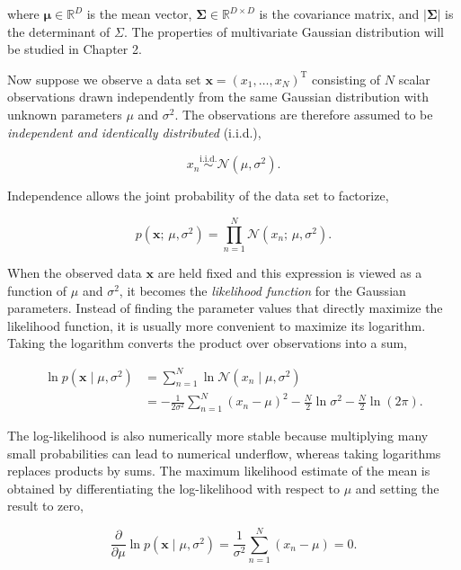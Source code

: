 \documentclass[10pt,twocolumn]{memoir}
\begin{document}
where $\boldsymbol{\mu}\in\mathbb{R}^{D}$ is the mean vector, $\boldsymbol{\Sigma}\in\mathbb{R}^{D\times D}$ is the covariance matrix, and $|\boldsymbol{\Sigma}|$ is the determinant of $\Sigma$. The properties of multivariate Gaussian distribution will be studied in Chapter 2.

Now suppose we observe a data set $\mathbf{x}=(x_1,\ldots,x_N)^{\mathrm{T}}$ consisting of $N$ scalar observations drawn independently from the same Gaussian distribution with unknown parameters $\mu$ and $\sigma^2$. The observations are therefore assumed to be \textit{independent and identically distributed} (i.i.d.),

\begin{equation}
    x_n \overset{\mathrm{i.i.d.}}{\sim}\mathcal{N}(\mu,\sigma^2).
\end{equation}

Independence allows the joint probability of the data set to factorize,

\begin{equation}
    p(\mathbf{x};\,\mu,\sigma^2) = \prod_{n=1}^{N}\mathcal{N}(x_n;\,\mu,\sigma^2).
\end{equation}

When the observed data $\mathbf{x}$ are held fixed and this expression is viewed as a function of $\mu$ and $\sigma^2$, it becomes the \textit{likelihood function} for the Gaussian parameters. Instead of finding the parameter values that directly maximize the likelihood function, it is usually more convenient to maximize its logarithm. Taking the logarithm converts the product over observations into a sum,

\begin{align}
    \ln p(\mathbf{x}\mid\mu,\sigma^2)
    &=
    \sum_{n=1}^{N}\ln \mathcal{N}(x_n\mid\mu,\sigma^2) \\
    &=
    -\frac{1}{2\sigma^2}\sum_{n=1}^{N}(x_n-\mu)^2-\frac{N}{2}\ln\sigma^2-\frac{N}{2}\ln(2\pi).
\end{align}

The log-likelihood is also numerically more stable because multiplying many small probabilities can lead to numerical underflow, whereas taking logarithms replaces products by sums. The maximum likelihood estimate of the mean is obtained by differentiating the log-likelihood with respect to $\mu$ and setting the result to zero,

\begin{equation}
    \frac{\partial}{\partial\mu} \ln p(\mathbf{x}\mid\mu,\sigma^2) = \frac{1}{\sigma^2}\sum_{n=1}^{N}(x_n-\mu) = 0.
\end{equation}
\end{document}
